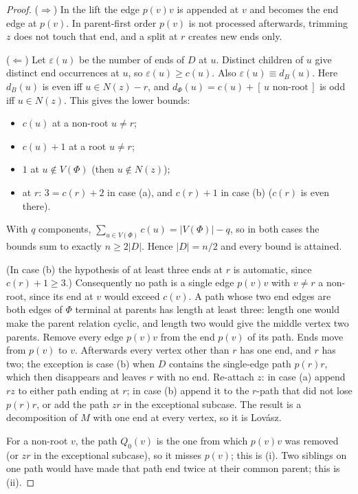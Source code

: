 \documentclass[11pt]{amsart}
\theoremstyle{definition}
\theoremstyle{remark}
\renewcommand{\_}{\oldunderscore\allowbreak}
\newcommand{\ind}[1]{[\,#1\,]}
\begin{document}
\begin{proof}
($\Rightarrow$) In the lift the edge $p(v)v$ is appended at $v$ and becomes the end edge at $p(v)$. In
parent-first order $p(v)$ is not processed afterwards, trimming $z$ does not touch that end, and a
split at $r$ creates new ends only.

($\Leftarrow$) Let $\varepsilon(u)$ be the number of ends of $D$ at $u$. Distinct children of $u$ give
distinct end occurrences at $u$, so $\varepsilon(u)\ge c(u)$. Also $\varepsilon(u)\equiv d_B(u)$. Here
$d_B(u)$ is even iff $u\in N(z)-r$, and $d_\Phi(u)=c(u)+\ind{u \text{ non-root}}$ is odd iff $u\in N(z)$.
This gives the lower bounds:
\begin{itemize}[leftmargin=*]
\item $c(u)$ at a non-root $u\neq r$;
\item $c(u)+1$ at a root $u\ne r$;
\item $1$ at $u\notin V(\Phi)$ (then $u\notin N(z)$);
\item at $r$: $3=c(r)+2$ in case (a), and $c(r)+1$ in case (b) ($c(r)$ is even there).
\end{itemize}
With $q$ components, $\sum_{u\in V(\Phi)}c(u)=|V(\Phi)|-q$, so in both cases the bounds sum to exactly
$n\ge2|D|$. Hence $|D|=n/2$ and every bound is attained.

(In case (b) the hypothesis of at least three ends at $r$ is automatic, since $c(r)+1\ge3$.)
Consequently no path is a single edge $p(v)v$ with $v\ne r$ a non-root, since its end at $v$ would
exceed $c(v)$. A path whose two end edges are both edges of $\Phi$ terminal at parents has length at
least three: length one would make the parent relation cyclic, and length two would give the
middle vertex two parents. Remove every edge $p(v)v$ from the end $p(v)$ of its path.
Ends move from $p(v)$ to $v$. Afterwards every vertex other than $r$ has one end, and $r$ has two;
the exception is case (b) when $D$ contains the single-edge path $p(r)r$, which then disappears and
leaves $r$ with no end. Re-attach $z$: in case (a) append $rz$ to either path ending at $r$; in case
(b) append it to the $r$-path that did not lose $p(r)r$, or add the path $zr$ in the exceptional
subcase. The result is a decomposition of $M$ with one end at every vertex, so it is Lov\'asz.

For a non-root $v$, the path $Q_0(v)$ is the one from which $p(v)v$ was removed (or $zr$ in the
exceptional subcase), so it misses $p(v)$; this is (i). Two siblings on one path would have made that
path end twice at their common parent; this is (ii).
\end{proof}
\end{document}
